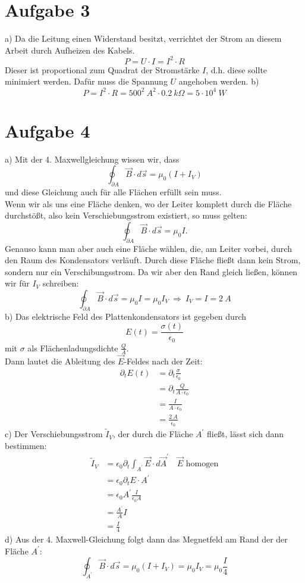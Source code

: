 \documentclass[11pt a4paper]{article}
\newcommand{\delt}{\partial_t}
\newcommand{\epsz}{\epsilon_0}
\newcommand{\del}{\partial}
\begin{document}
\newpage

\section*{Aufgabe 3}
a) Da die Leitung einen Widerstand besitzt, verrichtet der Strom an diesem Arbeit durch Aufheizen des Kabels.
\[ P = U \cdot I = I^2 \cdot R \]
Dieser ist proportional zum Quadrat der Stromstärke $I$, d.h. diese sollte minimiert werden. Dafür muss die 
Spannung $U$ angehoben werden.
b)
\[
	P = I^2 \cdot R = 500^2 \ A^2 \cdot 0.2 \ k\Omega = 5 \cdot 10^4 \ W
\]

\section*{Aufgabe 4}
a) Mit der 4. Maxwellgleichung wissen wir, dass 
\[ \oint_{\del A} \vec B \cdot d\vec s = \mu_0 (I + I_V) \]
und diese Gleichung auch für alle Flächen erfüllt sein muss. \\
Wenn wir als uns eine Fläche denken, wo der Leiter komplett durch die Fläche durchstößt, also kein 
Verschiebungsstrom existiert, so muss gelten:
\[ \oint_{\del A} \vec B \cdot d\vec s = \mu_0 I. \]
Genauso kann man aber auch eine Fläche wählen, die, am Leiter vorbei, durch den Raum des Kondensators verläuft.
Durch diese Fläche fließt dann kein Strom, sondern nur ein Verschibungsstrom. Da wir aber den Rand gleich ließen, 
können wir für $I_V$ schreiben:
\[ \oint_{\del A} \vec B \cdot d \vec s = \mu_0 I = \mu_0 I_V \ \Rightarrow \ I_V = I = 2 \ A \]
b) Das elektrische Feld des Plattenkondensators ist gegeben durch
\[ E(t) = \frac{\sigma(t)}{\epsz} \] 
mit $\sigma$ als Flächenladungsdichte $\frac{Q}{A}$. \\
Dann lautet die Ableitung des $\vec E$-Feldes nach der Zeit:
\begin{align*}
	\delt E(t) 
	&= \delt \frac{\sigma}{\epsz} \\
	&= \delt \frac{Q}{A \cdot \epsz} \\
	&= \frac{I}{A \cdot \epsz} \\
	&= \frac{2 \ A}{\epsz}
\end{align*}
c) Der Verschiebungsstrom $\tilde{I}_V$, der durch die Fläche $A^\prime$ fließt, lässt sich dann bestimmen:
\begin{align*}
	\tilde{I}_V
	&= \epsz \delt \int_{A^\prime} \vec E \cdot d \vec A^\prime \quad 
	\vec E \text{ homogen} \\
	&= \epsz \delt E \cdot A^\prime \\
	&= \epsz A^\prime \frac{I}{\epsz A} \\
	&= \frac{A^\prime}{A} I \\
	&= \frac{I}{4}
\end{align*}
d) Aus der 4. Maxwell-Gleichung folgt dann das Megnetfeld am Rand der der Fläche $A^\prime$:
\[ \oint_{A^\prime} \vec B \cdot d\vec s = \mu_0 (I + I_V) = \mu_0 I_V = \mu_0 \frac{I}{4} \]
\end{document}
